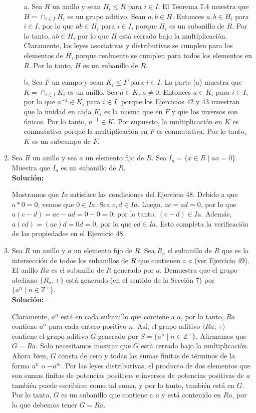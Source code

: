 \begin{enumerate}
	\begin{itemize}
		\item[a.] Sea $R$ un anillo y sean $H_i \leq R$ para $i \in I$. El Teorema 7.4 muestra que $H = \cap_{i\in I} H_i$ es un grupo aditivo. Sean $a, b \in H$. Entonces $a, b \in H_i$ para $i \in I$, por lo que $ab \in H_i$ para $i \in I$, porque $H_i$ es un subanillo de $R$. Por lo tanto, $ab \in H$, por lo que $H$ está cerrado bajo la multiplicación. Claramente, las leyes asociativas y distributivas se cumplen para los elementos de $H$, porque realmente se cumplen para todos los elementos en $R$. Por lo tanto, $H$ es un subanillo de $R$.
		\item[b.] 	Sea $F$ un campo y sean $K_i \leq F$ para $i \in I$. La parte (a) muestra que $K = \cap_{i\in I} K_i$ es un anillo. Sea $a \in K$, $a \neq 0$. Entonces $a \in K_i$ para $i \in I$, por lo que $a^{-1} \in K_i$ para $i \in I$, porque los Ejercicios 42 y 43 muestran que la unidad en cada $K_i$ es la misma que en $F$ y que los inversos son únicos. Por lo tanto, $a^{-1} \in K$. Por supuesto, la multiplicación en $K$ es conmutativa porque la multiplicación en $F$ es conmutativa. Por lo tanto, $K$ es un subcampo de $F$.
	\end{itemize}
	\item Sea $R$ un anillo y sea $a$ un elemento fijo de $R$. Sea $I_a = \{x \in R \mid ax = 0\}$. Muestra que $I_a$ es un subanillo de $R$.
	\\ \textbf{Solución:}
	
	Mostramos que $Ia$ satisface las condiciones del Ejercicio 48. Debido a que $a*0 = 0$, vemos que $0 \in Ia$. Sea $c, d \in Ia$. Luego, $ac = ad = 0$, por lo que $a(c - d) = ac - ad = 0 - 0 = 0$; por lo tanto, $(c - d) \in Ia$. Además, $a(cd) = (ac)d = 0d = 0$, por lo que $cd \in Ia$. Esto completa la verificación de las propiedades en el Ejercicio 48.
	
	
	\item Sea $R$ un anillo y $a$ un elemento fijo de $R$. Sea $R_a$ el subanillo de $R$ que es la intersección de todos los subanillos de $R$ que contienen a $a$ (ver Ejercicio 49). El anillo $Ra$ es el subanillo de $R$ generado por $a$. Demuestra que el grupo abeliano $\{R_a, +\}$ está generado (en el sentido de la Sección 7) por $\{a^n \mid n \in \mathbb{Z}^+\}$.
	\\ \textbf{Solución:}
	
	Claramente, $a^n$ está en cada subanillo que contiene a $a$, por lo tanto, $Ra$ contiene $a^n$ para cada entero positivo $n$. Así, el grupo aditivo $\langle Ra, + \rangle$ contiene el grupo aditivo $G$ generado por $S = \{a^n \mid n \in \mathbb{Z}^+\}$. Afirmamos que $G = Ra$. Solo necesitamos mostrar que $G$ está cerrado bajo la multiplicación. Ahora bien, $G$ consta de cero y todas las sumas finitas de términos de la forma $a^n$ o $-a^m$. Por las leyes distributivas, el producto de dos elementos que son sumas finitas de potencias positivas e inversos de potencias positivas de $a$ también puede escribirse como tal suma, y por lo tanto, también está en $G$. Por lo tanto, $G$ es un subanillo que contiene a $a$ y está contenido en $Ra$, por lo que debemos tener $G = Ra$.
	

\end{enumerate}
